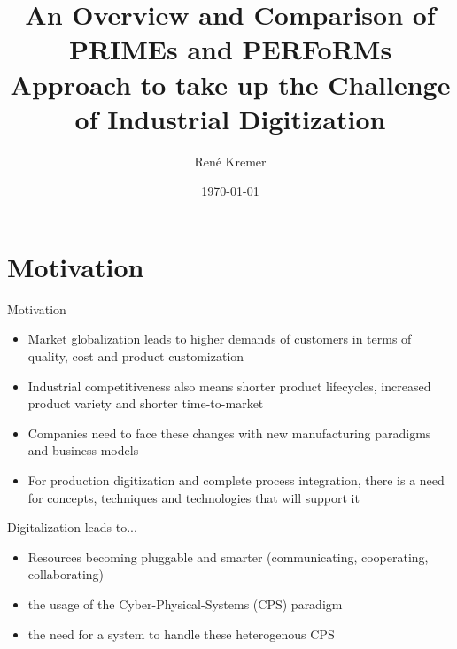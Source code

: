 \documentclass[12pt]{beamer}
\author[René Kremer]{\small René Kremer}
\title[An Overview and Comparison of PRIMEs and PERFoRMs Approach to take up the Challenge of Industrial Digitization]{An Overview and Comparison of PRIMEs and PERFoRMs Approach to take up the Challenge of Industrial Digitization}
\institute{Universität zu Lübeck}
\date{\today}
\begin{document}
\begin{frame}
	\titlepage
\end{frame}



\section{Motivation}

\begin{frame}{Motivation}
	\begin{itemize}
		\item Market globalization leads to higher demands of customers in terms of quality, cost and product customization
		\newline
		
		\item Industrial competitiveness also means shorter product lifecycles, increased product variety and shorter time-to-market
		\newline
		
		\item Companies need to face these changes with new manufacturing paradigms and business models
		\newline
		
		\item For production digitization and complete process integration, there is a need for concepts, techniques and technologies that will support it
	\end{itemize}
\end{frame}

\begin{frame}{Digitalization leads to...}
	\begin{itemize}
		\item Resources becoming pluggable and smarter (communicating, cooperating, collaborating)
		\newline 
		
		\item the usage of the Cyber-Physical-Systems (CPS) paradigm
		\newline
		
		\item the need for a system to handle these heterogenous CPS
	\end{itemize}
\end{frame}
\end{document}
